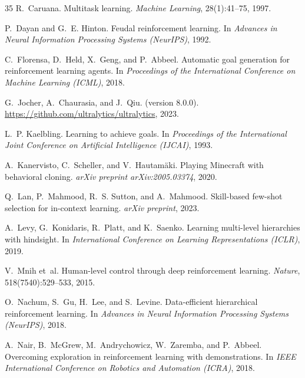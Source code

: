 \documentclass[11pt,a4paper]{article}
\begin{document}
\begin{thebibliography}{35}
R.~Caruana.
\newblock Multitask learning.
\newblock \emph{Machine Learning}, 28(1):41--75, 1997.

P.~Dayan and G.~E. Hinton.
\newblock Feudal reinforcement learning.
\newblock In \emph{Advances in Neural Information Processing Systems (NeurIPS)}, 1992.

C.~Florensa, D.~Held, X.~Geng, and P.~Abbeel.
\newblock Automatic goal generation for reinforcement learning agents.
\newblock In \emph{Proceedings of the International Conference on Machine Learning (ICML)}, 2018.

G.~Jocher, A.~Chaurasia, and J.~Qiu.
 (version 8.0.0).
\newblock \url{https://github.com/ultralytics/ultralytics}, 2023.

L.~P. Kaelbling.
\newblock Learning to achieve goals.
\newblock In \emph{Proceedings of the International Joint Conference on Artificial Intelligence (IJCAI)}, 1993.

A.~Kanervisto, C.~Scheller, and V.~Hautam{\"a}ki.
\newblock Playing Minecraft with behavioral cloning.
\newblock \emph{arXiv preprint arXiv:2005.03374}, 2020.

Q.~Lan, P.~Mahmood, R.~S. Sutton, and A.~Mahmood.
\newblock Skill-based few-shot selection for in-context learning.
\newblock \emph{arXiv preprint}, 2023.

A.~Levy, G.~Konidaris, R.~Platt, and K.~Saenko.
\newblock Learning multi-level hierarchies with hindsight.
\newblock In \emph{International Conference on Learning Representations (ICLR)}, 2019.

V.~Mnih et~al.
\newblock Human-level control through deep reinforcement learning.
\newblock \emph{Nature}, 518(7540):529--533, 2015.

O.~Nachum, S.~Gu, H.~Lee, and S.~Levine.
\newblock Data-efficient hierarchical reinforcement learning.
\newblock In \emph{Advances in Neural Information Processing Systems (NeurIPS)}, 2018.

A.~Nair, B.~McGrew, M.~Andrychowicz, W.~Zaremba, and P.~Abbeel.
\newblock Overcoming exploration in reinforcement learning with demonstrations.
\newblock In \emph{IEEE International Conference on Robotics and Automation (ICRA)}, 2018.


\end{thebibliography}
\end{document}
